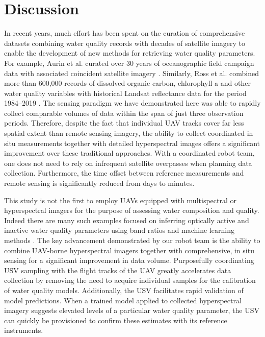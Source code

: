 \newpage

\section{Discussion}



In recent years, much effort has been spent on the curation of comprehensive
datasets combining water quality records with decades of satellite imagery to
enable the development of new methods for retrieving water quality parameters.
For example, Aurin et al. curated over 30 years of oceanographic field campaign
data with associated coincident satellite imagery \cite{aurin2018remote}.
Similarly, Ross et al. combined more than 600,000 records of dissolved organic
carbon, chlorophyll a and other water quality variables with historical Landsat reflectance data for the period 1984--2019 \cite{ross2019aquasat}. The sensing paradigm we have demonstrated here was able to rapidly collect comparable volumes of data within the span of just three observation periods. Therefore, despite the fact that individual UAV tracks cover far less spatial extent than remote sensing imagery, the ability to collect coordinated in situ measurements together with detailed hyperspectral images offers a significant improvement over these traditional approaches. With a coordinated robot team, one does not need to rely on infrequent satellite overpasses when planning data collection. Furthermore, the time offset between reference measurements and remote sensing is significantly reduced from days to minutes.

This study is not the first to employ UAVs equipped with multispectral or hyperspectral imagers for the purpose of assessing water composition and quality. Indeed there are many such examples focused on inferring optically active and inactive water quality parameters using band ratios and machine learning methods \cite{vogt2016near,lu2021retrieval, zhang2022selection}. The key advancement demonstrated by our robot team is the ability to combine UAV-borne hyperspectral imagers together with comprehensive, in situ sensing for a significant improvement in data volume. Purposefully coordinating USV sampling with the flight tracks of the UAV greatly accelerates data collection by removing the need to acquire individual samples for the calibration of water quality models. Additionally, the USV facilitates rapid validation of model predictions. When a trained model applied to collected hyperspectral imagery suggests elevated levels of a particular water quality parameter, the USV can quickly be provisioned to confirm these estimates with its reference instruments. 

